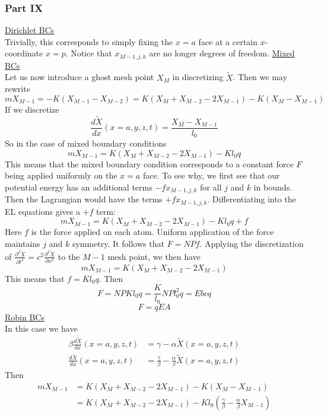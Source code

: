 \documentclass[letterpaper,12pt]{article}
\newcommand*{\deriv}[2]{\frac{d #1}{d #2}}
\newcommand*{\npderiv}[3]{\frac{\partial^{#3} #1}{\partial #2^{#3}}}
\begin{document}
\begin{flushleft}
    \subsubsection*{Part IX}
    \underline{Dirichlet BCs}\\
    Trivially, this corresponds to simply fixing the $x=a$ face at a certain $x$-coordinate $x=p$. Notice that $x_{M-1,j,k}$ are no longer degrees of freedom.\newline\newline
    \underline{Mixed BCs}\\
    Let us now introduce a ghost mesh point $X_M$ in discretizing $\tilde{X}$. Then we may rewrite
    $$mX_{M-1} = -K(X_{M-1} - X_{M-2}) = K(X_{M} + X_{M-2} - 2X_{M-1}) - K(X_M - X_{M-1})$$
    If we discretize
    $$\deriv{\tilde{X}}{x}(x=a,y,z,t) = \frac{X_M - X_{M-1}}{l_0}$$
    So in the case of mixed boundary conditions
    $$mX_{M-1} = K(X_{M} + X_{M-2} - 2X_{M-1}) - Kl_0q$$
    This means that the mixed boundary condition corresponds to a constant force $F$ being applied uniformly on the $x=a$ face. To see why, we first see that our potential energy has an additional terms $-fx_{M-1,j,k}$ for all $j$ and $k$ in bounds. Then the Lagrangian would have the terms $+fx_{M-1,j,k}$. Differentiating into the EL equations gives a $+f$ term:
    $$mX_{M-1} = K(X_{M} + X_{M-2} - 2X_{M-1}) - Kl_0q + f$$
    Here $f$ is the force applied on each atom. Uniform application of the force maintains $j$ and $k$ symmetry. It follows that $F = NPf$. Applying the discretization of $\npderiv{\tilde{X}}{t}{2} = c^2\npderiv{\tilde{X}}{x}{2}$ to the $M-1$ mesh point, we then have
    $$mX_{M-1} = K(X_{M} + X_{M-2} - 2X_{M-1})$$
    This means that $f = Kl_0q$. Then
    $$F = NPKl_0q = \frac{K}{l_0}NPl_0^2q = Ebcq$$
    $$\boxed{F = qEA}$$
    \underline{Robin BCs}\\
    In this case we have
    \begin{align*}
        \beta\deriv{\tilde{X}}{x}(x=a,y,z,t) &= \gamma - \alpha\tilde{X}(x=a,y,z,t) \\
        \deriv{\tilde{X}}{x}(x=a,y,z,t) &= \frac{\gamma}{\beta} - \frac{\alpha}{\beta}\tilde{X}(x=a,y,z,t)
    \end{align*}
    Then
    \begin{align*}
        mX_{M-1} &= K(X_{M} + X_{M-2} - 2X_{M-1}) - K(X_M - X_{M-1}) \\
        &= K(X_{M} + X_{M-2} - 2X_{M-1}) - Kl_0\left(\frac{\gamma}{\beta} - \frac{\alpha}{\beta}X_{M-1}\right) \\

\end{align*}
\end{flushleft}
\end{document}
